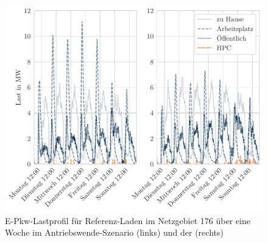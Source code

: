 \begin{figure}[H]
    \centering
    \includegraphics[width=\textwidth]{Bilder/example_load_profile}
    \caption{E-Pkw-Lastprofil für Referenz-Laden im Netzgebiet \num{176} über eine Woche im Antriebswende-Szenario (links) und der \SzeFirmenparkplatz (rechts)}\label{fig:example_load_profile}
\end{figure}